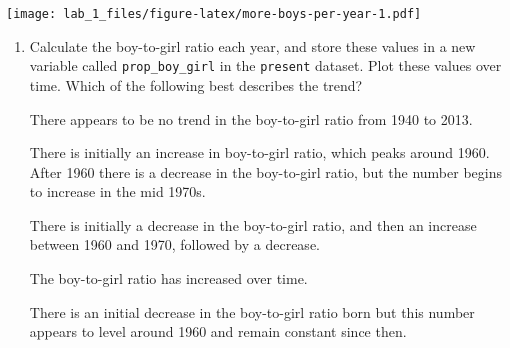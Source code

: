 \documentclass[
]{article}
\newenvironment{Shaded}{\begin{snugshade}}{\end{snugshade}}
\newcommand{\CommentTok}[1]{\textcolor[rgb]{0.56,0.35,0.01}{\textit{#1}}}
\newcommand{\FunctionTok}[1]{\textcolor[rgb]{0.13,0.29,0.53}{\textbf{#1}}}
\newcommand{\NormalTok}[1]{#1}
\newcommand{\OtherTok}[1]{\textcolor[rgb]{0.56,0.35,0.01}{#1}}
\newcommand{\SpecialCharTok}[1]{\textcolor[rgb]{0.81,0.36,0.00}{\textbf{#1}}}
\providecommand{\tightlist}{%
  \setlength{\itemsep}{0pt}\setlength{\parskip}{0pt}}
\begin{document}
\begin{Shaded}
\end{Shaded}

\texttt{[image: lab\_1\_files/figure-latex/more-boys-per-year-1.pdf]}

\begin{enumerate}
\def\labelenumi{\arabic{enumi}.}
\setcounter{enumi}{6}
\tightlist
\item
  Calculate the boy-to-girl ratio each year, and store these values in a
  new variable called \texttt{prop\_boy\_girl} in the \texttt{present}
  dataset. Plot these values over time. Which of the following best
  describes the trend?

  There appears to be no trend in the boy-to-girl ratio from 1940 to
  2013.

  There is initially an increase in boy-to-girl ratio, which peaks
  around 1960. After 1960 there is a decrease in the boy-to-girl ratio,
  but the number begins to increase in the mid 1970s.

  There is initially a decrease in the boy-to-girl ratio, and then an
  increase between 1960 and 1970, followed by a decrease.

  The boy-to-girl ratio has increased over time.

  There is an initial decrease in the boy-to-girl ratio born but this
  number appears to level around 1960 and remain constant since then.
\end{enumerate}

\begin{Shaded}
\end{Shaded}
\end{document}
